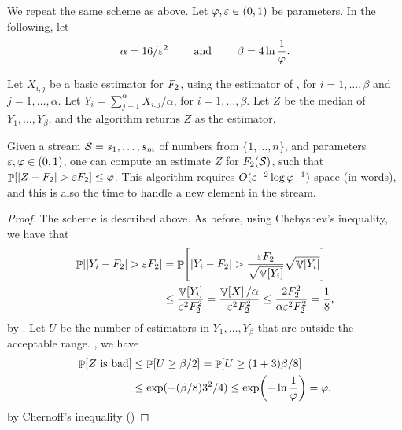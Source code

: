 We repeat the same scheme as above.  Let $\varphi, {\varepsilon} \in (0,1)$ be
parameters.  In the following, let
\begin{equation*}
    \alpha = 16 / \eps^2%
    \qquad\text{ and }\qquad%
    \beta = 4 \ln \frac{1}{\BadProb}.%
\end{equation*}

Let $X_{i,j}$ be a basic estimator for $F_2$, using the estimator
of , for $i=1,\ldots, \beta$ and
$j=1, \ldots, \alpha$.  Let
$Y_i = \sum_{j=1}^{\alpha} X_{i,j} / \alpha$, for
$i=1, \ldots, \beta$. Let $Z$ be the median of $Y_1, \ldots, Y_\beta$,
and the algorithm returns $Z$ as the estimator.



\begin{theorem}
    Given a stream $\mathcal{S} = {s}_1, \ldots, {s}_m$ of numbers from
    $\{1,\ldots, n\}$, and parameters ${\varepsilon}, \varphi \in (0,1)$, one
    can compute an estimate $Z$ for $F_2(\mathcal{S})$, such that
    $\Prob{ |Z - \Frq_2| > \eps \Frq_2} \leq \BadProb$. This algorithm
    requires $O( {\varepsilon}^{-2} \log \varphi^{-1})$ space (in words), and
    this is also the time to handle a new element in the stream.
\end{theorem}
\begin{proof}
    The scheme is described above. As before, using Chebyshev's
    inequality, we have that
    \begin{align*}
        \Prob{ \cardin{Y_i - \Frq_2} > \eps \Frq_2 }%
        &= %
        \Prob{ \cardin{Y_i - \Frq_2} >
           \frac{\eps \Frq_2}{ \sqrt{\Var{Y_i}}} \sqrt{\Var{Y_i}}}%
        \\&\leq%
        \frac{\Var{Y_i}}{\eps^2 \Frq_2^2}%
        =%
        \frac{\Var{X} / \alpha}{\eps^2 \Frq_2^2}%
        \leq %
        \frac{2 \Frq_2^2}{\alpha \eps^2 \Frq_2^2}%
        =%
        \frac{1}{8},
    \end{align*}
    by . Let $U$ be the number of estimators in
    $Y_1, \ldots, Y_\beta$ that are outside the acceptable range.
     , we have
    \begin{align*}
        \Prob{Z \text{ is bad}}%
        &\leq%
        \Prob{U \geq \beta/2} %
        = %
        \Prob{U \geq (1+ 3)\beta/8}%
        \\&\leq%
        \exp( - (\beta/8) 3^2/4 )%
        \leq%
        \exp\pth{ - \ln \frac{1}{\BadProb}}
        =%
        \BadProb,
    \end{align*}
    by Chernoff's inequality ()
\end{proof}

